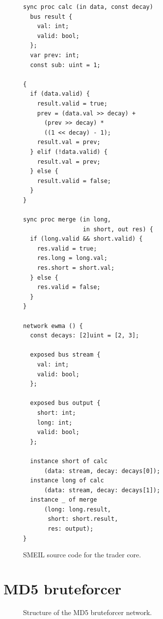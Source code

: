 \begin{figure}

\begin{lstlisting}[language=smeil, multicols=2]
sync proc calc (in data, const decay)
  bus result {
    val: int;
    valid: bool;
  };
  var prev: int;
  const sub: uint = 1;

{
  if (data.valid) {
    result.valid = true;
    prev = (data.val >> decay) +
      (prev >> decay) *
      ((1 << decay) - 1);
    result.val = prev;
  } elif (!data.valid) {
    result.val = prev;
  } else {
    result.valid = false;
  }
}

sync proc merge (in long,
                 in short, out res) {
  if (long.valid && short.valid) {
    res.valid = true;
    res.long = long.val;
    res.short = short.val;
  } else {
    res.valid = false;
  }
}

network ewma () {
  const decays: [2]uint = [2, 3];

  exposed bus stream {
    val: int;
    valid: bool;
  };

  exposed bus output {
    short: int;
    long: int;
    valid: bool;
  };

  instance short of calc 
      (data: stream, decay: decays[0]);
  instance long of calc
      (data: stream, decay: decays[1]);
  instance _ of merge
      (long: long.result,
       short: short.result,
       res: output);
}

\end{lstlisting}
  \caption{SMEIL source code for the trader core.}
  \label{fig:tradesrc}
   \end{figure}

\section{MD5 bruteforcer}
\begin{figure}%
  \centering
  \caption{Structure of the MD5 bruteforcer network.}
  \label{fig:md5net}
\end{figure}

